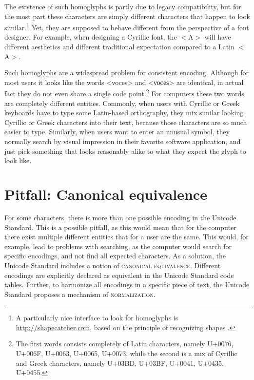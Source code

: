 The existence of such homoglyphs is partly due to legacy compatibility, but for the most part these characters are simply different characters that happen to look similar.\footnote{A particularly nice interface to look for homoglyphs is \url{http://shapecatcher.com}, based on the principle of recognizing shapes \citep{Belongie_etal2002}.} Yet, they are supposed to behave different from the perspective of a font designer. For example, when designing a Cyrillic font, the $<$A$>$ will have different aesthetics and different traditional expectation compared to a Latin $<$A$>$.

Such homoglyphs are a widespread problem for consistent encoding. Although for most users it looks like the words <voces> and <νοсеѕ> are identical, in actual fact they do not even share a single code point.\footnote{The first words consists completely of Latin characters, namely U+0076, U+006F, U+0063, U+0065, U+0073, while the second is a mix of Cyrillic and Greek characters, namely U+03BD, U+03BF, U+0041, U+0435, U+0455.} For computers these two words are completely different entities. Commonly, when users with Cyrillic or Greek keyboards have to type some Latin-based orthography, they mix similar looking Cyrillic or Greek characters into their text, because those characters are so much easier to type. Similarly, when users want to enter an unusual symbol, they normally search by visual impression in their favorite software application, and just pick something that looks reasonably alike to what they expect the glyph to look like.

\section{Pitfall: Canonical equivalence}
\label{pitfall-canonical-equivalence}

For some characters, there is more than one possible encoding in the Unicode Standard. This is a possible pitfall, as this would mean that for the computer there exist multiple different entities that for a user are the same. This would, for example, lead to problems with searching, as the computer would search for specific encodings, and not find all expected characters. As a solution, the Unicode Standard includes a notion of \textsc{canonical equivalence}. Different encodings are explicitly declared as equivalent in the Unicode Standard code tables. Further, to harmonize all encodings in a specific piece of text, the Unicode Standard proposes a mechanism of \textsc{normalization}.


